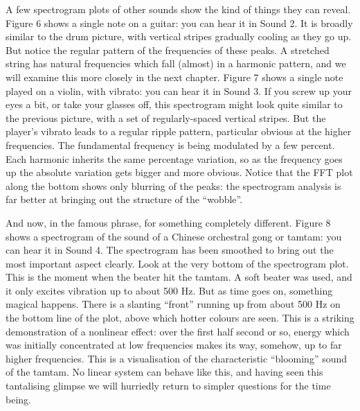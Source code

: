   A few spectrogram plots of other sounds show the kind of things they can 
  reveal. Figure 6 shows a single note on a guitar: you can hear it in Sound 2. 
  It is broadly similar to the drum picture, with vertical stripes gradually 
  cooling as they go up. But notice the regular pattern of the frequencies of 
  these peaks. A stretched string has natural frequencies which fall (almost) 
  in a harmonic pattern, and we will examine this more closely in the next 
  chapter. Figure 7 shows a single note played on a violin, with vibrato: you 
  can hear it in Sound 3. If you screw up your eyes a bit, or take your glasses 
  off, this spectrogram might look quite similar to the previous picture, with 
  a set of regularly-spaced vertical stripes. But the player's vibrato leads to 
  a regular ripple pattern, particular obvious at the higher frequencies. The 
  fundamental frequency is being modulated by a few percent. Each harmonic 
  inherits the same percentage variation, so as the frequency goes up the 
  absolute variation gets bigger and more obvious. Notice that the FFT plot 
  along the bottom shows only blurring of the peaks: the spectrogram analysis 
  is far better at bringing out the structure of the ``wobble''. 





  And now, in the famous phrase, for something completely different. Figure 8 
  shows a spectrogram of the sound of a Chinese orchestral gong or tamtam: you 
  can hear it in Sound 4. The spectrogram has been smoothed to bring out the 
  most important aspect clearly. Look at the very bottom of the spectrogram 
  plot. This is the moment when the beater hit the tamtam. A soft beater was 
  used, and it only excites vibration up to about 500 Hz. But as time goes on, 
  something magical happens. There is a slanting ``front'' running up from 
  about 500 Hz on the bottom line of the plot, above which hotter colours are 
  seen. This is a striking demonstration of a nonlinear effect: over the first 
  half second or so, energy which was initially concentrated at low frequencies 
  makes its way, somehow, up to far higher frequencies. This is a visualisation 
  of the characteristic ``blooming'' sound of the tamtam. No linear system can 
  behave like this, and having seen this tantalising glimpse we will hurriedly 
  return to simpler questions for the time being. 




